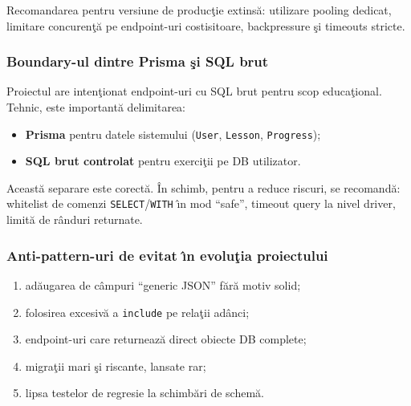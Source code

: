 \documentclass[12pt,onecolumn,draftclsnofoot]{IEEEtran}
\begin{document}
Recomandarea pentru versiune de produc\c{t}ie extins\u{a}: utilizare pooling dedicat, limitare concuren\c{t}\u{a} pe endpoint-uri costisitoare, backpressure \c{s}i timeouts stricte.

\subsubsection{Boundary-ul dintre Prisma \c{s}i SQL brut}
Proiectul are inten\c{t}ionat endpoint-uri cu SQL brut pentru scop educa\c{t}ional. Tehnic, este important\u{a} delimitarea:
\begin{itemize}
  \item \textbf{Prisma} pentru datele sistemului (\texttt{User}, \texttt{Lesson}, \texttt{Progress});
  \item \textbf{SQL brut controlat} pentru exerci\c{t}ii pe DB utilizator.
\end{itemize}

Aceast\u{a} separare este corect\u{a}. \^{I}n schimb, pentru a reduce riscuri, se recomand\u{a}: whitelist de comenzi \texttt{SELECT}/\texttt{WITH} \^{\i}n mod \enquote{safe}, timeout query la nivel driver, limit\u{a} de r\^{a}nduri returnate.

\subsubsection{Anti-pattern-uri de evitat \^{\i}n evolu\c{t}ia proiectului}
\begin{enumerate}[label=\arabic*)]
  \item ad\u{a}ugarea de c\^{a}mpuri \enquote{generic JSON} f\u{a}r\u{a} motiv solid;
  \item folosirea excesiv\u{a} a \texttt{include} pe rela\c{t}ii ad\^{a}nci;
  \item endpoint-uri care returneaz\u{a} direct obiecte DB complete;
  \item migra\c{t}ii mari \c{s}i riscante, lansate rar;
  \item lipsa testelor de regresie la schimb\u{a}ri de schem\u{a}.
\end{enumerate}

\newpage
\end{document}

